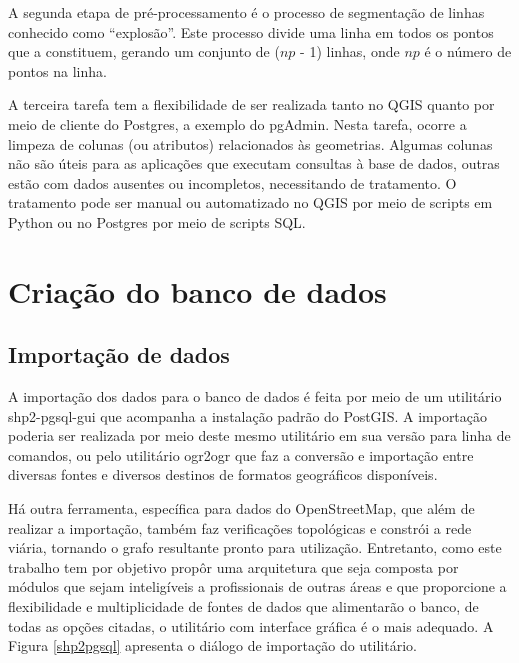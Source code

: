\documentclass[oneside,openright,12pt]{ufsm_2015} %
\begin{document}
A segunda etapa de pré-processamento é o processo de segmentação de linhas conhecido como ``explosão''. 
Este processo divide uma linha em todos os pontos que a constituem, gerando um conjunto de ($np$ - 1) linhas, onde $np$ é o número de pontos na linha.

A terceira tarefa tem a flexibilidade de ser realizada tanto no QGIS quanto por meio de cliente do Postgres, a exemplo do pgAdmin. 
Nesta tarefa, ocorre a limpeza de colunas (ou atributos) relacionados às geometrias. 
Algumas colunas não são úteis para as aplicações que executam consultas à base de dados, outras estão com dados ausentes ou incompletos, necessitando de tratamento.
O tratamento pode ser manual ou automatizado no QGIS por meio de scripts em Python ou no Postgres por meio de scripts SQL. 



\section{Criação do banco de dados}

\subsection{Importação de dados}
A importação dos dados para o banco de dados é feita por meio de um utilitário shp2-pgsql-gui que acompanha a instalação padrão do PostGIS. 
A importação poderia ser realizada por meio deste mesmo utilitário em sua versão para linha de comandos, ou pelo utilitário ogr2ogr que faz a conversão e importação entre diversas fontes e diversos destinos de formatos geográficos disponíveis.

Há outra ferramenta, específica para dados do OpenStreetMap, que além de realizar a importação, também faz verificações topológicas e constrói a rede viária, tornando o grafo resultante pronto para utilização.
Entretanto, como este trabalho tem por objetivo propôr uma arquitetura que seja composta por módulos que sejam inteligíveis a profissionais de outras áreas e que proporcione a flexibilidade e multiplicidade de fontes de dados que alimentarão o banco, de todas as opções citadas, o utilitário com interface gráfica é o mais adequado. 
A Figura \ref{shp2pgsql} apresenta o diálogo de importação do utilitário.
\end{document}
